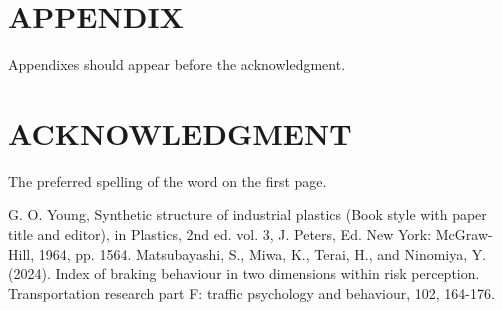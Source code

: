 \documentclass[letterpaper, 10 pt, conference]{ieeeconf}  %
\begin{document}
\section*{APPENDIX}
Appendixes should appear before the acknowledgment.

\section*{ACKNOWLEDGMENT}
The preferred spelling of the word on the first page. 

\begin{thebibliography}{99}

 G. O. Young, Synthetic structure of industrial plastics (Book style with paper title and editor), in Plastics, 2nd ed. vol. 3, J. Peters, Ed.  New York: McGraw-Hill, 1964, pp. 1564.
 Matsubayashi, S., Miwa, K., Terai, H., and Ninomiya, Y. (2024). Index of braking behaviour in two dimensions within risk perception. Transportation research part F: traffic psychology and behaviour, 102, 164-176.

\end{thebibliography}
\end{document}
